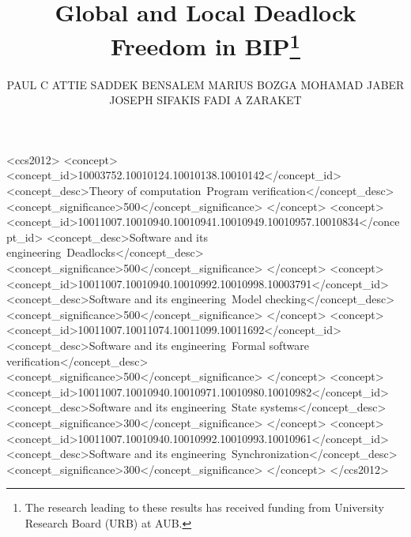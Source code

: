 \documentclass[prodmode,acmtosem]{acmsmall} %
\begin{document}
\sloppy



\title{Global and Local Deadlock Freedom in BIP\thanks{The research leading to these results has received funding from University Research Board (URB) at AUB.}
}


\author{PAUL C ATTIE
SADDEK BENSALEM
MARIUS BOZGA
MOHAMAD JABER
JOSEPH SIFAKIS
FADI A ZARAKET
}





\begin{CCSXML}
<ccs2012>
<concept>
<concept_id>10003752.10010124.10010138.10010142</concept_id>
<concept_desc>Theory of computation~Program verification</concept_desc>
<concept_significance>500</concept_significance>
</concept>
<concept>
<concept_id>10011007.10010940.10010941.10010949.10010957.10010834</concept_id>
<concept_desc>Software and its engineering~Deadlocks</concept_desc>
<concept_significance>500</concept_significance>
</concept>
<concept>
<concept_id>10011007.10010940.10010992.10010998.10003791</concept_id>
<concept_desc>Software and its engineering~Model checking</concept_desc>
<concept_significance>500</concept_significance>
</concept>
<concept>
<concept_id>10011007.10011074.10011099.10011692</concept_id>
<concept_desc>Software and its engineering~Formal software verification</concept_desc>
<concept_significance>500</concept_significance>
</concept>
<concept>
<concept_id>10011007.10010940.10010971.10010980.10010982</concept_id>
<concept_desc>Software and its engineering~State systems</concept_desc>
<concept_significance>300</concept_significance>
</concept>
<concept>
<concept_id>10011007.10010940.10010992.10010993.10010961</concept_id>
<concept_desc>Software and its engineering~Synchronization</concept_desc>
<concept_significance>300</concept_significance>
</concept>
</ccs2012>
\end{CCSXML}

\end{document}
